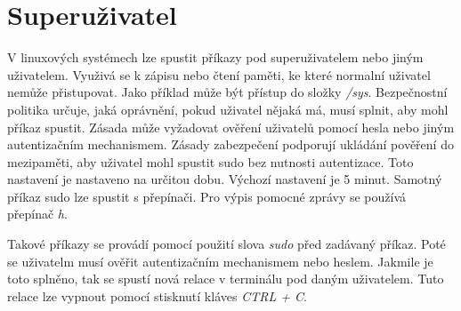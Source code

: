 \section{Superuživatel}
\label{sec:SuperUzivatel}

V linuxových systémech lze spustit příkazy pod superuživatelem\cite{Sudo} nebo jiným uživatelem. Využivá se k zápisu nebo čtení paměti, ke které normalní uživatel nemůže přistupovat. Jako příklad může být přístup do složky \emph{/sys}. Bezpečnostní politika určuje, jaká oprávnění, pokud uživatel nějaká má, musí splnit, aby mohl příkaz spustit. Zásada může vyžadovat ověření uživatelů pomocí hesla nebo jiným autentizačním mechanismem. Zásady zabezpečení podporují ukládání pověření do mezipaměti, aby uživatel mohl spustit sudo bez nutnosti autentizace. Toto nastavení je nastaveno na určitou dobu. Výchozí nastavení je 5 minut. Samotný příkaz sudo lze spustit s přepínači. Pro výpis pomocné zprávy se používá přepínač \emph{h}.

Takové příkazy se provádí pomocí použití slova \emph{sudo} před zadávaný příkaz. Poté se uživatelm musí ověřit autentizačním mechanismem nebo heslem. Jakmile je toto splněno, tak se spustí nová relace v terminálu pod daným uživatelem. Tuto relace lze vypnout pomocí stisknutí kláves \emph{CTRL + C}.

